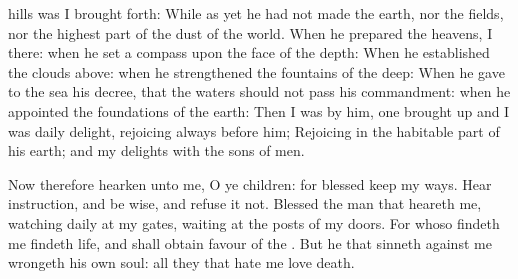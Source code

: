 {hills was I brought
forth:
While as yet he had not
made the
earth, nor the
fields, nor the highest
part of the
dust of the
world.
When he
prepared the
heavens, I
{} there: when he
set a
compass upon the
face of the
depth:
When he
established the
clouds
above: when he
strengthened the
fountains of the
deep:
When he
gave to the
sea his
decree, that the
waters should not
pass his
commandment: when he
appointed the
foundations of the
earth:
Then I was by
him,
{} one brought
up
{} and I was
daily
{}
delight,
rejoicing
always
before him;
Rejoicing in the habitable
part of his
earth; and my
delights
{} with the
sons of
men.
\par }{\PP {}Now therefore
hearken unto me, O ye
children: for
blessed
{}
keep my
ways.
Hear
instruction, and be
wise, and
refuse it not.
Blessed
{} the
man that
heareth me,
watching
daily at my
gates,
waiting at the
posts of my
doors.
For whoso
findeth me
findeth
life, and shall
obtain
favour of the
{}.
But he that
sinneth against me
wrongeth his own
soul: all they that
hate me
love
death.

}
